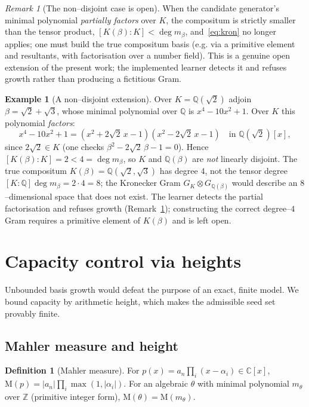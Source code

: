 \documentclass[11pt]{article}
\theoremstyle{plain}
\theoremstyle{definition}
\newtheorem{definition}[theorem]{Definition}
\newtheorem{example}[theorem]{Example}
\theoremstyle{remark}
\newtheorem{remark}[theorem]{Remark}
\newcommand{\Q}{\mathbb{Q}}
\newcommand{\Z}{\mathbb{Z}}
\newcommand{\C}{\mathbb{C}}
\newcommand{\K}{K}
\newcommand{\Mah}{\mathrm{M}}
\newcommand{\GG}{G}
\begin{document}
\begin{remark}[The non--disjoint case is open]\label{rem:nondisjoint}
When the candidate generator's minimal polynomial \emph{partially factors} over $\K$, the compositum is
strictly smaller than the tensor product, $[\K(\beta):\K]<\deg m_\beta$, and~\eqref{eq:kron} no longer
applies; one must build the true compositum basis (e.g. via a primitive element and resultants, with
factorisation over a number field). This is a genuine open extension of the present work; the implemented
learner detects it and refuses growth rather than producing a fictitious Gram.
\end{remark}

\begin{example}[A non--disjoint extension]\label{ex:nondisjoint}
Over $\K=\Q(\sqrt2)$ adjoin $\beta=\sqrt2+\sqrt3$, whose minimal polynomial over $\Q$ is $x^4-10x^2+1$. Over
$\K$ this polynomial \emph{factors}:
\[
  x^4-10x^2+1=(x^2+2\sqrt2\,x-1)(x^2-2\sqrt2\,x-1)\quad\text{in }\Q(\sqrt2)[x],
\]
since $2\sqrt2\in\K$ (one checks $\beta^2-2\sqrt2\,\beta-1=0$). Hence $[\K(\beta):\K]=2<4=\deg m_\beta$, so
$\K$ and $\Q(\beta)$ are \emph{not} linearly disjoint. The true compositum $\K(\beta)=\Q(\sqrt2,\sqrt3)$ has
degree $4$, not the tensor degree $[\K:\Q]\deg m_\beta=2\cdot4=8$; the Kronecker Gram
$\GG_\K\otimes\GG_{\Q(\beta)}$ would describe an $8$--dimensional space that does not exist. The learner
detects the partial factorisation and refuses growth (Remark~\ref{rem:nondisjoint}); constructing the correct
degree--$4$ Gram requires a primitive element of $\K(\beta)$ and is left open.
\end{example}

\section{Capacity control via heights}\label{sec:capacity}

Unbounded basis growth would defeat the purpose of an exact, finite model. We bound capacity by arithmetic
height, which makes the admissible seed set provably finite.

\subsection{Mahler measure and height}
\begin{definition}[Mahler measure]\label{def:mahler}
For $p(x)=a_n\prod_{i}(x-\alpha_i)\in\C[x]$, $\Mah(p)=|a_n|\prod_i\max(1,|\alpha_i|)$. For an algebraic
$\theta$ with minimal polynomial $m_\theta$ over $\Z$ (primitive integer form), $\Mah(\theta)=\Mah(m_\theta)$.
\end{definition}
\end{document}
